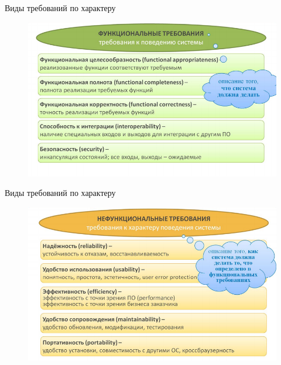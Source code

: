 \documentclass{beamer}
\begin{document}
\begin{frame}[t]{Виды требований по характеру}
\begin{figure}[h]
\centering
\includegraphics[scale=0.5]{images/lec02-pic05.png}
\end{figure}
\end{frame}    

\begin{frame}[t]{Виды требований по характеру}
\begin{figure}[h]
\centering
\includegraphics[scale=0.5]{images/lec02-pic06.png}
\end{figure}
\end{frame}    
\end{document}
